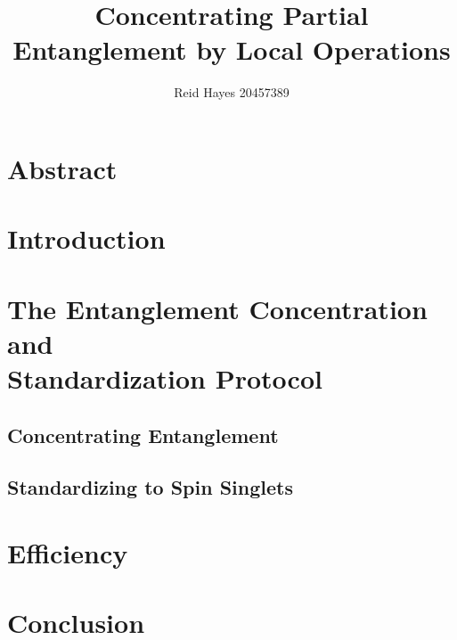 \documentclass[12pt,letterpaper]{article}
\author{Reid Hayes 20457389}
\title{Concentrating Partial Entanglement by Local Operations}
\begin{document}
\maketitle
\section{Abstract}
\section{Introduction}


\section{The Entanglement Concentration and \\Standardization Protocol}
\subsection{Concentrating Entanglement}
\label{sec:concentrating}


\subsection{Standardizing to Spin Singlets}
\label{sec:standardizing}

\section{Efficiency}

\section{Conclusion}

\printbibliography
\end{document}
